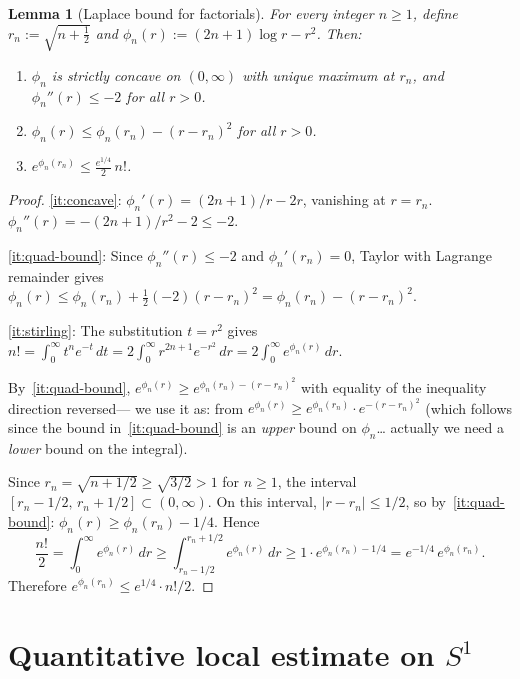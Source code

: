 \documentclass[11pt]{article}
\newtheorem{lemma}[theorem]{Lemma}
\begin{document}
\begin{lemma}[Laplace bound for factorials]\label{lem:laplace}
For every integer $n \ge 1$, define $r_n := \sqrt{n+\tfrac12}$ and
$\phi_n(r) := (2n+1)\log r - r^2$. Then:
\begin{enumerate}[label=(\alph*)]
\item\label{it:concave}
  $\phi_n$ is strictly concave on $(0,\infty)$ with unique maximum at $r_n$,
  and $\phi_n''(r) \le -2$ for all $r > 0$.
\item\label{it:quad-bound}
  $\phi_n(r) \le \phi_n(r_n) - (r-r_n)^2$ for all $r > 0$.
\item\label{it:stirling}
  $e^{\phi_n(r_n)} \le \frac{e^{1/4}}{2}\,n!$.
\end{enumerate}
\end{lemma}
\begin{proof}
\ref{it:concave}:
$\phi_n'(r) = (2n+1)/r - 2r$, vanishing at $r = r_n$.
$\phi_n''(r) = -(2n+1)/r^2 - 2 \le -2$.

\ref{it:quad-bound}:
Since $\phi_n''(r) \le -2$ and $\phi_n'(r_n) = 0$,
Taylor with Lagrange remainder gives
$\phi_n(r) \le \phi_n(r_n) + \frac{1}{2}(-2)(r-r_n)^2 = \phi_n(r_n)-(r-r_n)^2$.

\ref{it:stirling}:
The substitution $t = r^2$ gives
$n! = \int_0^\infty t^n e^{-t}\,dt = 2\int_0^\infty r^{2n+1}e^{-r^2}\,dr
= 2\int_0^\infty e^{\phi_n(r)}\,dr$.

By~\ref{it:quad-bound},
$e^{\phi_n(r)} \ge e^{\phi_n(r_n)-(r-r_n)^2}$ with equality of the inequality direction reversed---
we use it as: from $e^{\phi_n(r)} \ge e^{\phi_n(r_n)}\cdot e^{-(r-r_n)^2}$
(which follows since the bound in~\ref{it:quad-bound} is an \emph{upper} bound on $\phi_n$\ldots
actually we need a \emph{lower} bound on the integral).

Since $r_n = \sqrt{n+1/2} \ge \sqrt{3/2} > 1$ for $n \ge 1$,
the interval $[r_n-1/2,\,r_n+1/2] \subset (0,\infty)$.
On this interval, $|r-r_n|\le 1/2$, so by~\ref{it:quad-bound}:
$\phi_n(r) \ge \phi_n(r_n) - 1/4$.
Hence
\[
  \frac{n!}{2}
  = \int_0^\infty e^{\phi_n(r)}\,dr
  \ge \int_{r_n-1/2}^{r_n+1/2} e^{\phi_n(r)}\,dr
  \ge 1\cdot e^{\phi_n(r_n)-1/4}
  = e^{-1/4}\,e^{\phi_n(r_n)}.
\]
Therefore $e^{\phi_n(r_n)} \le e^{1/4}\cdot n!/2$.
\end{proof}

\section{Quantitative local estimate on $S^1$}\label{sec:local}
\end{document}

